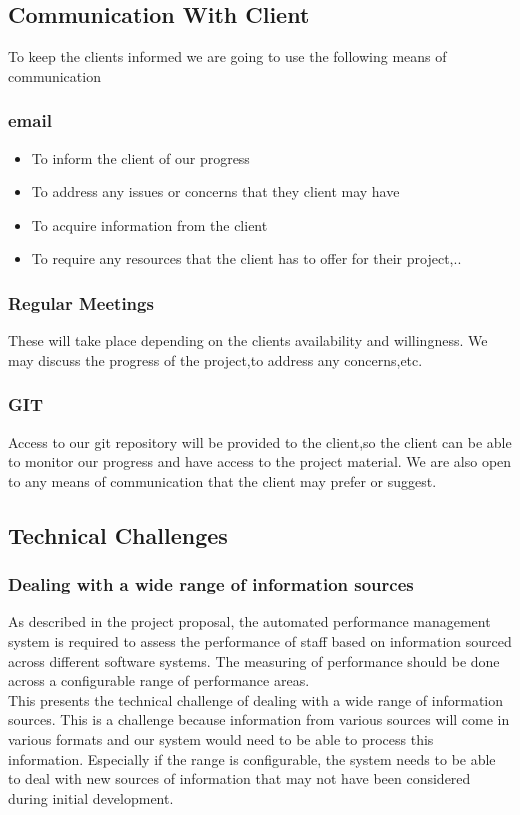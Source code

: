 \documentclass[a4paper,12pt]{article}
\begin{document}
\subsection{Communication With Client}
To keep the clients informed we are going to use the following means of communication
\subsubsection{email}
\begin{itemize}
\item To inform the client of our progress
\item To address any issues or concerns that they client may have
\item To acquire information from the client
\item To require any resources that the client has to offer for their project,..
\end{itemize}
\subsubsection{Regular Meetings}
These will take place depending on the clients availability and willingness.
We may discuss the progress of the project,to address any concerns,etc.
\subsubsection{GIT}
Access to our git repository will be provided to the client,so the client can be able to monitor
our progress and have access to the project material.
We are also open to any means of communication that the client may prefer or suggest.
\subsection{Technical Challenges}
\subsubsection{Dealing with a wide range of information sources}
As described in the project proposal, the automated performance management system is required to assess the performance of staff based on information sourced across different software systems. The measuring of performance should be done across a configurable range of performance areas.\\

This presents the technical challenge of dealing with a wide range of information sources. This is a challenge because information from various sources will come in various formats and our system would need to be able to process this information. Especially if the range is configurable, the system needs to be able to deal with new sources of information that may not have been considered during initial development.\\
\end{document}
